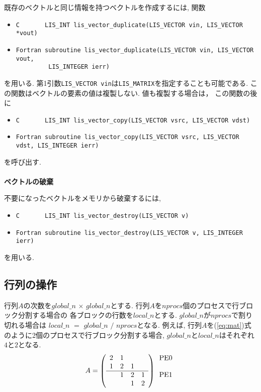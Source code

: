 \documentclass[a4paper]{jarticle}
\begin{document}
{{既存のベクトルと同じ情報を持つベクトルを作成するには, 関数
\begin{itemize}
\item \verb|C       LIS_INT lis_vector_duplicate(LIS_VECTOR vin, LIS_VECTOR *vout)|
\item \verb|Fortran subroutine lis_vector_duplicate(LIS_VECTOR vin, LIS_VECTOR vout,|\\
      \verb|         LIS_INTEGER ierr)|
\end{itemize}
を用いる. 第1引数\verb|LIS_VECTOR vin|は\verb|LIS_MATRIX|を指定することも可能である. 
この関数はベクトルの要素の値は複製しない. 値も複製する場合は，
この関数の後に
\begin{itemize}
\item \verb|C       LIS_INT lis_vector_copy(LIS_VECTOR vsrc, LIS_VECTOR vdst)|
\item \verb|Fortran subroutine lis_vector_copy(LIS_VECTOR vsrc, LIS_VECTOR vdst, LIS_INTEGER ierr)|
\end{itemize}
を呼び出す. 
\\ \\
\noindent
{\bf ベクトルの破棄}

不要になったベクトルをメモリから破棄するには, 
\begin{itemize}
\item \verb|C       LIS_INT lis_vector_destroy(LIS_VECTOR v)|
\item \verb|Fortran subroutine lis_vector_destroy(LIS_VECTOR v, LIS_INTEGER ierr)|
\end{itemize}
を用いる. 

\subsection{行列の操作}
行列$A$の次数を$global\_n$ $\times$ $global\_n$とする. 
行列$A$を$nprocs$個のプロセスで行ブロック分割する場合の
各ブロックの行数を$local\_n$とする. 
$global\_n$が$nprocs$で割り切れる場合は
$local\_n$ $=$ $global\_n$ $/$ $nprocs$となる. 
例えば, 
行列$A$を(\ref{eq:mat})式のように2個のプロセスで行ブロック分割する場合, 
$global\_n$と$local\_n$はそれぞれ$4$と$2$となる. 
\begin{equation}
\label{eq:mat}
A = 
\left(
\begin{array}{cccc}
2 & 1 &   &    \\
1 & 2 & 1 &    \\ \hline
  & 1 & 2 & 1 \\
  &   & 1 & 2 
\end{array}
\right)
\begin{array}{l}
\mbox{PE0} \\
    \\
\mbox{PE1} \\
   \\ 
\end{array}
\end{equation}

}}
\end{document}
